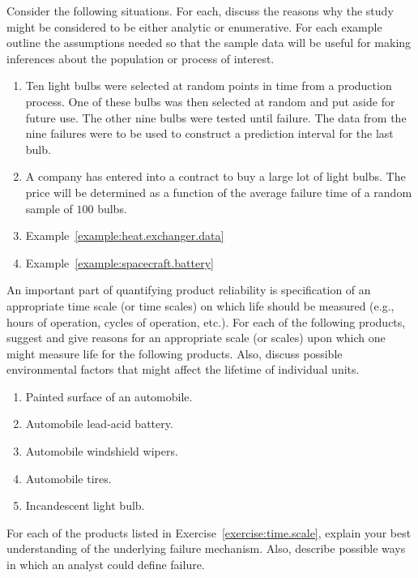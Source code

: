 \begin{exercise}
Consider the following situations. For each, discuss the reasons why
the study might be considered to be either analytic or enumerative.
For each example outline the assumptions needed so that the
sample data will be useful for making inferences about the population
or process of interest.
\begin{enumerate}
\item
Ten light bulbs were selected at random points in time from a
production process. One of these bulbs was then selected at random and
put aside for future use. The other nine bulbs were tested until
failure. The data from the nine failures were to be used to construct a
prediction interval for the last bulb.
\item
A company has entered into a contract to buy a large lot of light
bulbs. The price will be determined as a function of the average
failure time of a random sample of $100$ bulbs.
\item
Example~\ref{example:heat.exchanger.data}
\item
Example~\ref{example:spacecraft.battery}
\end{enumerate}
\end{exercise}


\begin{exercise}
\label{exercise:time.scale}
An important part of quantifying product reliability is specification
of an appropriate time scale (or time scales) on which life should be
measured (e.g., hours of operation, cycles of operation, etc.). For
each of the following products, suggest and give reasons for an
appropriate scale (or scales) upon which one might measure life for
the following products. Also, discuss possible environmental factors
that might affect the lifetime of individual units.
\begin{enumerate}
\item
Painted surface of an automobile.
\item
Automobile lead-acid battery.
\item
Automobile windshield wipers.
\item
Automobile tires.
\item
Incandescent light bulb.
\end{enumerate}
\end{exercise}

\begin{exercise}
For each of the products listed in
Exercise~\ref{exercise:time.scale}, explain your best understanding
of the underlying failure mechanism. Also, describe possible ways in
which an analyst could define failure.
\end{exercise}


